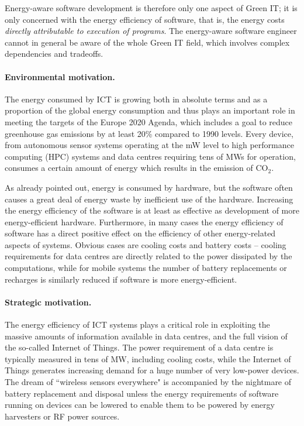 \documentclass[oneside]{book}
\begin{document}
Energy-aware software development is therefore only one aspect of Green IT;  it is only concerned with the energy efficiency of software, that is, the energy costs \emph{directly attributable to execution of programs}. The energy-aware software engineer cannot in general be aware of the whole Green IT field, which involves complex dependencies and tradeoffs. 



\paragraph{Environmental motivation.}
The energy consumed by ICT is growing both in absolute terms and as a proportion of the global energy consumption and thus plays an important role in meeting the targets of the Europe 2020 Agenda, which includes a goal to reduce greenhouse gas emissions by at least 20\% compared to 1990 levels.   Every device, from autonomous sensor systems operating at the mW level to high performance computing (HPC) systems and data centres requiring tens of MWs for operation, consumes a certain amount of energy which results in the emission of CO$_2$. 

As already pointed out, energy is consumed by hardware, but the software often causes a great deal of energy waste by inefficient use of the hardware.  Increasing the energy efficiency of the software is at least as effective as development of more energy-efficient hardware.
Furthermore, in many cases the energy efficiency of software has a direct positive effect on the efficiency of other energy-related aspects of systems.  Obvious cases are cooling costs and battery costs -- cooling requirements for data centres are directly related to the power dissipated by the computations, while for mobile systems the number of battery replacements or recharges is similarly reduced if software is more energy-efficient.  

\paragraph{Strategic motivation.} 
The energy efficiency of ICT systems plays a critical role in exploiting the massive amounts of information available in data centres, and the full vision of the so-called Internet of Things.  The power requirement of a data centre is typically measured in tens of MW, including cooling costs, while the Internet of Things generates increasing demand for a huge number of very low-power devices. The dream of ``wireless sensors everywhere" is accompanied by the nightmare of battery replacement and disposal unless the energy requirements of software running on devices can be lowered to enable them to be powered by energy harvesters or RF power sources.
\end{document}
